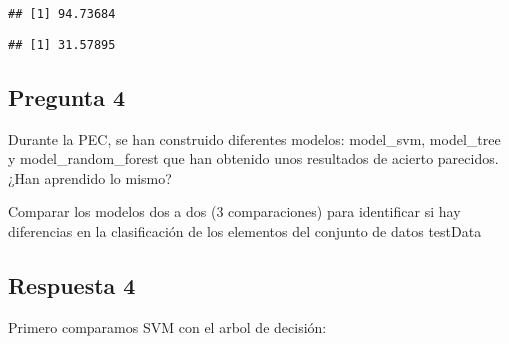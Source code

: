 \documentclass[]{article}
\newenvironment{Shaded}{\begin{snugshade}}{\end{snugshade}}
\newcommand{\KeywordTok}[1]{\textcolor[rgb]{0.94,0.87,0.69}{#1}}
\newcommand{\DataTypeTok}[1]{\textcolor[rgb]{0.87,0.87,0.75}{#1}}
\newcommand{\DecValTok}[1]{\textcolor[rgb]{0.86,0.86,0.80}{#1}}
\newcommand{\StringTok}[1]{\textcolor[rgb]{0.80,0.58,0.58}{#1}}
\newcommand{\CommentTok}[1]{\textcolor[rgb]{0.50,0.62,0.50}{#1}}
\newcommand{\OtherTok}[1]{\textcolor[rgb]{0.94,0.94,0.56}{#1}}
\newcommand{\OperatorTok}[1]{\textcolor[rgb]{0.94,0.94,0.82}{#1}}
\newcommand{\NormalTok}[1]{\textcolor[rgb]{0.80,0.80,0.80}{#1}}
\begin{document}
\begin{verbatim}
## [1] 94.73684
\end{verbatim}

\begin{Shaded}
\end{Shaded}

\begin{verbatim}
## [1] 31.57895
\end{verbatim}

\subsection{Pregunta 4}\label{pregunta-4}

Durante la PEC, se han construido diferentes modelos: model\_svm,
model\_tree y model\_random\_forest que han obtenido unos resultados de
acierto parecidos. ¿Han aprendido lo mismo?

Comparar los modelos dos a dos (3 comparaciones) para identificar si hay
diferencias en la clasificación de los elementos del conjunto de datos
testData

\subsection{Respuesta 4}\label{respuesta-4}

Primero comparamos SVM con el arbol de decisión:

\begin{Shaded}
\end{Shaded}
\end{document}
